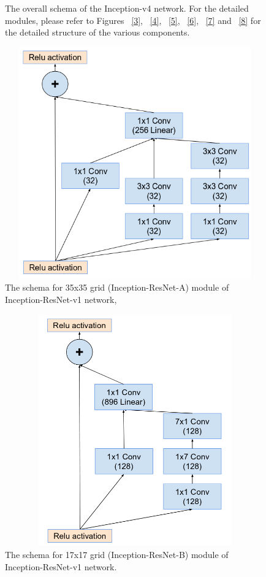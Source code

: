 \documentclass[a4paper,12pt, twoside]{NITKReport}
\begin{document}
\begin{figure}
\begin{minipage}[b]{0.4\textwidth}
    \caption{The overall schema of the Inception-v4 network. For the
detailed modules, please refer to Figures ~\ref{3}, ~\ref{4}, ~\ref{5}, ~\ref{6}, ~\ref{7} and ~\ref{8} for the detailed structure of the various components.~\cite{szegedy2017inception}}
    \label{9}
  \end{minipage}
\end{figure}


\begin{figure}[h]
  \centering
    \includegraphics[height=10cm,width=13cm]{figure10.png}
\caption{The  schema  for 35x35 grid  (Inception-ResNet-A) module of Inception-ResNet-v1 network,~\cite{szegedy2017inception}}
\label{10}
\end{figure}

\begin{figure}[h]
  \centering
    \includegraphics[height=10cm,width=13cm]{figure11.png}
    \caption{The  schema  for 17x17 grid  (Inception-ResNet-B) module of Inception-ResNet-v1 network.~\cite{szegedy2017inception}}
    \label{11}
 
\end{figure}
\end{document}
